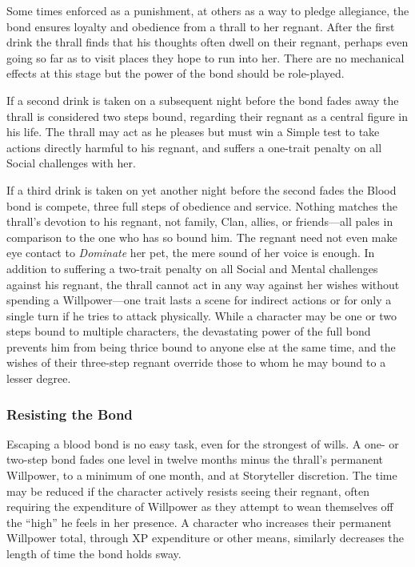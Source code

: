 Some times enforced as a punishment, at others as a way to pledge allegiance, the bond 
ensures loyalty and obedience from a thrall to her regnant.  After the first drink the 
thrall finds that his thoughts often dwell on their regnant, perhaps even going so far 
as to visit places they hope to run into her.  There are no mechanical effects at this 
stage but the power of the bond should be role-played.

If a second drink is taken on a subsequent night before the bond fades away the thrall 
is considered two steps bound, regarding their regnant as a central figure in his life.  
The thrall may act as he pleases but must win a Simple test to take actions directly 
harmful to his regnant, and suffers a one-trait penalty on all Social challenges with her.

If a third drink is taken on yet another night before the second fades the Blood bond is 
compete, three full steps of obedience and service.  Nothing matches the thrall's 
devotion to his regnant, not family, Clan, allies, or friends---all pales in 
comparison to the one who has so bound him.  The regnant need not even make eye contact 
to \emph{Dominate} her pet, the mere sound of her voice is enough.  In addition to 
suffering a two-trait penalty on all Social and Mental challenges against his regnant, 
the thrall cannot act in any way against her wishes without spending a Willpower---one 
trait lasts a scene for indirect actions or for only a single turn if he tries to 
attack physically.  While a character may be one or two steps bound to multiple characters, 
the devastating power of the full bond prevents him from being thrice bound to anyone else 
at the same time, and the wishes of their three-step regnant override those to whom he may 
bound to a lesser degree.

\subsubsection{Resisting the Bond}
Escaping a blood bond is no easy task, even for the strongest of wills.  A one- or two-step 
bond fades one level in twelve months minus the thrall's permanent Willpower, to a minimum of 
one month, and at Storyteller discretion.  The time may be reduced if the character actively 
resists seeing their regnant, often requiring the expenditure of Willpower as they attempt 
to wean themselves off the ``high'' he feels in her presence.  A character who increases their 
permanent Willpower total, through XP expenditure or other means, similarly decreases the length 
of time the bond holds sway.

